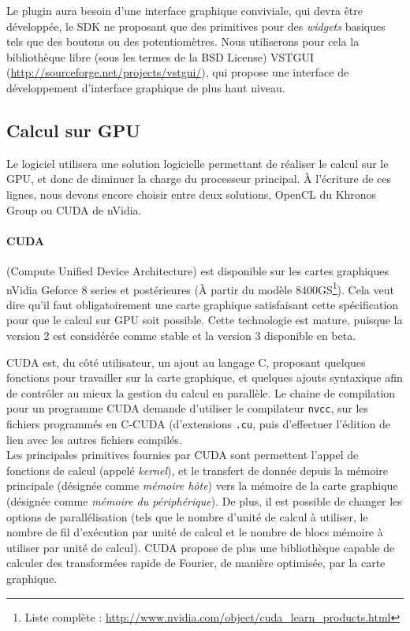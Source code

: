 Le plugin aura besoin d'une interface graphique conviviale, qui devra être développée, le SDK ne proposant que des primitives pour des \emph{widgets} basiques tels que des boutons ou des potentiomètres. Nous utiliserons pour cela la bibliothèque libre (sous les termes de la BSD License) VSTGUI (\url{http://sourceforge.net/projects/vstgui/}), qui propose une interface de développement d'interface graphique de plus haut niveau.
\subsection{Calcul sur GPU}
Le logiciel utilisera une solution logicielle permettant de réaliser le calcul sur le GPU, et donc de diminuer la charge du processeur principal.
À l'écriture de ces lignes, nous devons encore choisir entre deux solutions, OpenCL du Khronos Group ou CUDA de nVidia.

\paragraph{CUDA}
(Compute Unified Device Architecture) est disponible sur les cartes graphiques nVidia Geforce 8 series  et postérieures (À partir du modèle 8400GS\footnote{Liste complète : \url{http://www.nvidia.com/object/cuda\_learn\_products.html}}). Cela veut dire qu'il faut obligatoirement une carte graphique satisfaisant cette spécification pour que le calcul sur GPU soit possible. Cette technologie est mature, puisque la version 2 est considérée comme stable et la version 3 disponible en beta.

CUDA est, du côté utilisateur, un ajout au langage C, proposant quelques fonctions pour travailler sur la carte graphique, et quelques ajouts syntaxique afin de contrôler au mieux la gestion du calcul en parallèle. Le chaine de compilation pour un programme CUDA demande d'utiliser le compilateur {\tt nvcc}, sur les fichiers programmés en C-CUDA (d'extensions {\tt .cu}, puis d'effectuer l'édition de lien avec les autres fichiers compilés.\\

Les principales primitives fournies par CUDA sont permettent l'appel de fonctions de calcul (appelé \emph{kernel}), et le transfert de donnée depuis la mémoire principale (désignée comme \emph{mémoire hôte}) vers la mémoire de la carte graphique (désignée comme \emph{mémoire du périphérique}). De plus, il est possible de changer les options de parallélisation (tels que le nombre d'unité de calcul à utiliser, le nombre de fil d'exécution par unité de calcul et le nombre de blocs mémoire à utiliser par unité de calcul).
CUDA propose de plus une bibliothèque capable de calculer des transformées rapide de Fourier, de manière optimisée, par la carte graphique.

